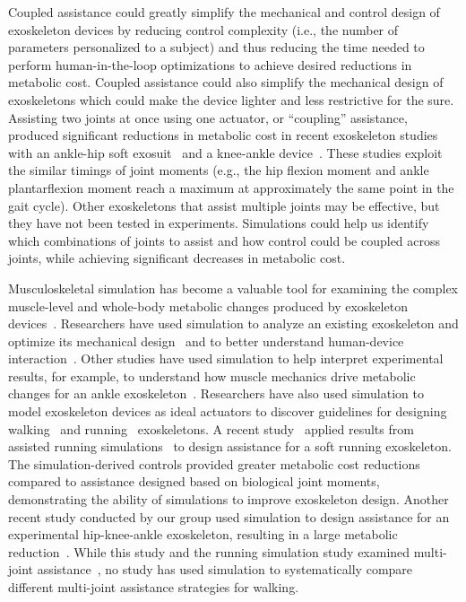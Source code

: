 \documentclass[10pt,letterpaper]{article}
\begin{document}
Coupled assistance could greatly simplify the mechanical and control design of exoskeleton devices by reducing control complexity (i.e., the number of parameters personalized to a subject) and thus reducing the time needed to perform human-in-the-loop optimizations to achieve desired reductions in metabolic cost. Coupled assistance could also simplify the mechanical design of exoskeletons which could make the device lighter and less restrictive for the sure. Assisting two joints at once using one actuator, or ``coupling'' assistance, produced significant reductions in metabolic cost in recent exoskeleton studies with an ankle-hip soft exosuit~\cite{Ding:2017, Panizzolo:2016, Quinlivan:2017, Lee:2018} and a knee-ankle device~\cite{Malcolm:2018}. These studies exploit the similar timings of joint moments (e.g., the hip flexion moment and ankle plantarflexion moment reach a maximum at approximately the same point in the gait cycle). Other exoskeletons that assist multiple joints may be effective, but they have not been tested in experiments. Simulations could help us identify which combinations of joints to assist and how control could be coupled across joints, while achieving significant decreases in metabolic cost.  

Musculoskeletal simulation has become a valuable tool for examining the complex muscle-level and whole-body metabolic changes produced by exoskeleton devices~\cite{Grabke:2019}. Researchers have used simulation to analyze an existing exoskeleton and optimize its mechanical design~\cite{Manns:2017} and to better understand human-device interaction~\cite{Fournier:2018}. Other studies have used simulation to help interpret experimental results, for example, to understand how muscle mechanics drive metabolic changes for an ankle exoskeleton~\cite{Jackson:2017}. Researchers have also used simulation to model exoskeleton devices as ideal actuators to discover guidelines for designing walking~\cite{Dembia:2017} and running~\cite{Uchida:2016} exoskeletons. A recent study~\cite{Lee:2017} applied results from assisted running simulations~\cite{Uchida:2016} to design assistance for a soft running exoskeleton. The simulation-derived controls provided greater metabolic cost reductions compared to assistance designed based on biological joint moments, demonstrating the ability of simulations to improve exoskeleton design. Another recent study conducted by our group used simulation to design assistance for an experimental hip-knee-ankle exoskeleton, resulting in a large metabolic reduction~\cite{Franks:2020}. While this study and the running simulation study examined multi-joint assistance~\cite{Uchida:2016}, no study has used simulation to systematically compare different multi-joint assistance strategies for walking.
\end{document}
